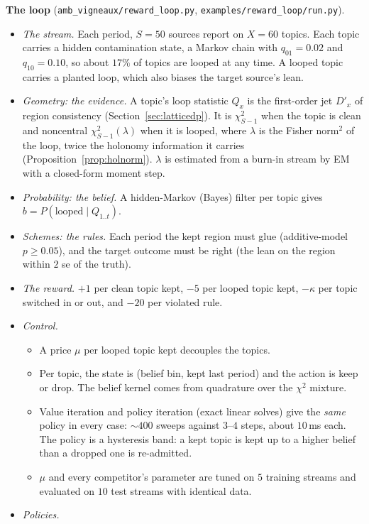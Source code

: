 \documentclass[11pt]{article}
\theoremstyle{definition}
\theoremstyle{remark}
\begin{document}
\textbf{The loop} (\texttt{amb\_vigneaux/reward\_loop.py}, \texttt{examples/reward\_loop/run.py}).
\begin{itemize}
  \item \emph{The stream.} Each period, $S=50$ sources report on $X=60$ topics. Each topic carries a hidden contamination state, a Markov chain with $q_{01}=0.02$ and $q_{10}=0.10$, so about $17\%$ of topics are looped at any time. A looped topic carries a planted loop, which also biases the target source's lean.
  \item \emph{Geometry: the evidence.} A topic's loop statistic $Q_x$ is the first-order jet $D'_x$ of region consistency (Section~\ref{sec:latticedp}). It is $\chi^2_{S-1}$ when the topic is clean and noncentral $\chi^2_{S-1}(\lambda)$ when it is looped, where $\lambda$ is the Fisher norm$^2$ of the loop, twice the holonomy information it carries (Proposition~\ref{prop:holnorm}). $\lambda$ is estimated from a burn-in stream by EM with a closed-form moment step.
  \item \emph{Probability: the belief.} A hidden-Markov (Bayes) filter per topic gives $b=P(\text{looped}\mid Q_{1..t})$.
  \item \emph{Schemes: the rules.} Each period the kept region must glue (additive-model $p\ge0.05$), and the target outcome must be right (the lean on the region within $2$ se of the truth).
  \item \emph{The reward.} $+1$ per clean topic kept, $-5$ per looped topic kept, $-\kappa$ per topic switched in or out, and $-20$ per violated rule.
  \item \emph{Control.}
  \begin{itemize}
    \item A price $\mu$ per looped topic kept decouples the topics.
    \item Per topic, the state is (belief bin, kept last period) and the action is keep or drop. The belief kernel comes from quadrature over the $\chi^2$ mixture.
    \item Value iteration and policy iteration (exact linear solves) give the \emph{same} policy in every case: $\sim400$ sweeps against $3$--$4$ steps, about $10$\,ms each. The policy is a hysteresis band: a kept topic is kept up to a higher belief than a dropped one is re-admitted.
    \item $\mu$ and every competitor's parameter are tuned on $5$ training streams and evaluated on $10$ test streams with identical data.
  \end{itemize}
  \item \emph{Policies.}

\end{itemize}
\end{document}
